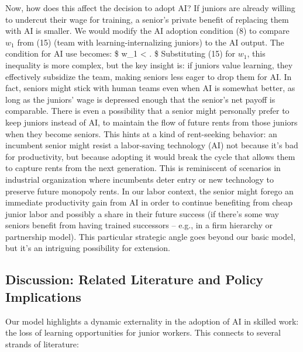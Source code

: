 \documentclass[12pt]{article}
\begin{document}
Now, how does this affect the decision to adopt AI? If juniors are
already willing to undercut their wage for training, a senior's private
benefit of replacing them with AI is smaller. We would modify the
{AI adoption condition} (8) to compare \(w_1\) from (15) (team
with learning-internalizing juniors) to the AI output. The condition for
AI use becomes: \$ w\_1 
\textless{} . \$ Substituting (15) for
\(w_1\), this inequality is more complex, but the key insight is:
{if juniors value learning, they effectively subsidize the team,
making seniors less eager to drop them for AI}. In fact, seniors might
stick with human teams even when AI is somewhat better, as long as the
juniors' wage is depressed enough that the senior's net payoff is
comparable. There is even a possibility that a {senior might
{personally prefer} to keep juniors instead of AI}, to maintain the
flow of future rents from those juniors when they become seniors. This
hints at a kind of {rent-seeking behavior}: an incumbent senior
might resist a labor-saving technology (AI) not because it's bad for
productivity, but because adopting it would break the cycle that allows
them to capture rents from the next generation. This is reminiscent of
scenarios in industrial organization where incumbents deter entry or new
technology to preserve future monopoly rents. In our labor context, the
senior might forego an immediate productivity gain from AI in order to
continue benefiting from cheap junior labor and possibly a share in
their future success (if there's some way seniors benefit from having
trained successors -- e.g., in a firm hierarchy or partnership model).
This particular strategic angle goes beyond our basic model, but it's an
intriguing possibility for extension.

\subsection{Discussion: Related Literature and Policy
Implications}\label{discussion-related-literature-and-policy-implications}

Our model highlights a {dynamic externality} in the adoption of
AI in skilled work: the loss of learning opportunities for junior
workers. This connects to several strands of literature:
\end{document}
